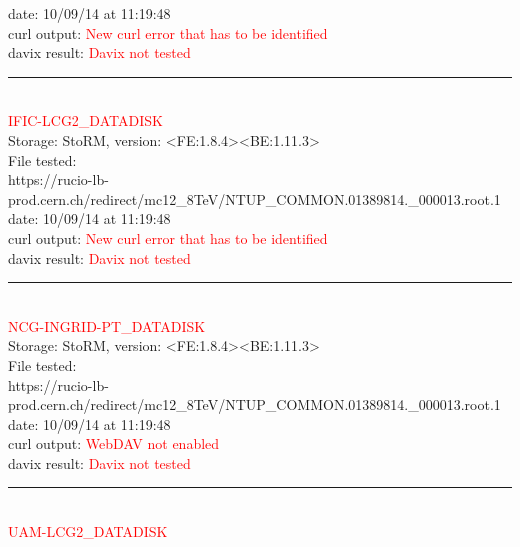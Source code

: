 date: 10/09/14 at 11:19:48\\

curl output:  \textcolor{red}{New curl error that has to be identified}\\

davix result:  \textcolor{red}{Davix not tested}\\

\rule{\textwidth}{1pt}\\

\textcolor{red}{\normalsize{IFIC-LCG2\_DATADISK}}\\

Storage: StoRM, version: <FE:1.8.4><BE:1.11.3>\\

File tested:\\
\footnotesize{https://rucio-lb-prod.cern.ch/redirect/mc12\_8TeV/NTUP\_COMMON.01389814.\_000013.root.1}\\

date: 10/09/14 at 11:19:48\\

curl output:  \textcolor{red}{New curl error that has to be identified}\\

davix result:  \textcolor{red}{Davix not tested}\\

\rule{\textwidth}{1pt}\\

\textcolor{red}{\normalsize{NCG-INGRID-PT\_DATADISK}}\\

Storage: StoRM, version: <FE:1.8.4><BE:1.11.3>\\

File tested:\\
\footnotesize{https://rucio-lb-prod.cern.ch/redirect/mc12\_8TeV/NTUP\_COMMON.01389814.\_000013.root.1}\\

date: 10/09/14 at 11:19:48\\

curl output:  \textcolor{red}{WebDAV not enabled}\\

davix result:  \textcolor{red}{Davix not tested}\\

\rule{\textwidth}{1pt}\\

\textcolor{red}{\normalsize{UAM-LCG2\_DATADISK}}\\


